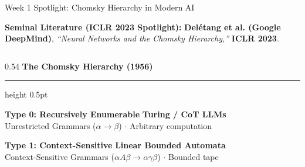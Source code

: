\documentclass[aspectratio=169, 10pt]{beamer}
\newcommand{\colheader}[1]{%
  {\noindent\footnotesize\bfseries\color{gimpanavy}#1}%
  \vspace{0.03cm}%
  {\color{gimpanavy!30}\hrule height 0.5pt}%
  \vspace{0.08cm}%
}
\begin{document}
\begin{frame}{Week 1 Spotlight: Chomsky Hierarchy in Modern AI}
  \begin{tcolorbox}[spotlightcard, top=2pt, bottom=2pt, before=\vspace{0pt}, after=\vspace{2pt}]
    \footnotesize
    \textbf{Seminal Literature (ICLR 2023 Spotlight):} 
    \textbf{Delétang et al. (Google DeepMind)}, \textit{``Neural Networks and the Chomsky Hierarchy,''} \textbf{ICLR 2023}.
  \end{tcolorbox}

  \vspace{0.04cm}
  \begin{columns}[T]
    \begin{column}{0.54\textwidth}
      \colheader{The Chomsky Hierarchy (1956)}
      \begin{tcolorbox}[conceptcard, colback=gimpanavy!6, borderline west={2.5pt}{0pt}{gimpanavy}, top=1.2pt, bottom=1.2pt, before=\vspace{0.5pt}, after=\vspace{0.5pt}]
        \scriptsize
        \textbf{Type 0: Recursively Enumerable} \hfill \textbf{Turing / CoT LLMs}\\
        {\tiny\color{gimpaslate}Unrestricted Grammars ($\alpha \to \beta$) $\cdot$ Arbitrary computation}
      \end{tcolorbox}
      \begin{tcolorbox}[conceptcard, colback=gimpaaccent!7, borderline west={2.5pt}{0pt}{gimpaaccent}, top=1.2pt, bottom=1.2pt, before=\vspace{0.5pt}, after=\vspace{0.5pt}]
        \scriptsize
        \textbf{Type 1: Context-Sensitive} \hfill \textbf{Linear Bounded Automata}\\
        {\tiny\color{gimpaslate}Context-Sensitive Grammars ($\alpha A \beta \to \alpha \gamma \beta$) $\cdot$ Bounded tape}
      \end{tcolorbox}
      \begin{tcolorbox}[conceptcard, colback=accentAmber!7, borderline west={2.5pt}{0pt}{accentAmber}, top=1.2pt, bottom=1.2pt, before=\vspace{0.5pt}, after=\vspace{0.5pt}]

\end{tcolorbox}
\end{column}
\end{columns}
\end{frame}
\end{document}
